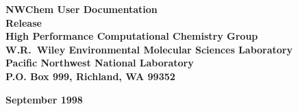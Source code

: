 
\begin{titlepage}

\begin{centering}


{\bf\Huge NWChem User Documentation}\\[0.5in] 
{\bf\Huge Release \nwchemversion}\\[1.0in]

{\bf\Large High Performance Computational Chemistry Group\\
    W.R.\ Wiley Environmental Molecular Sciences Laboratory\\
    Pacific Northwest National Laboratory\\
    P.O. Box 999, Richland, WA 99352\\[0.5in]}

{\bf\Large September 1998}\\[1.0in]




\end{centering}

\end{titlepage}
